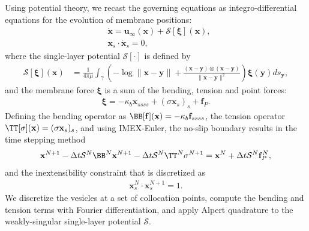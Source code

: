 \documentclass[11pt]{article}
\newcommand{\ff}{\mathbf{f}}
\newcommand{\uu}{\mathbf{u}}
\newcommand{\xx}{\mathbf{x}}
\renewcommand{\SS}{\mathcal{S}}
\newcommand{\xxi}{\boldsymbol{\xi}}
\newcommand{\yy}{\mathbf{y}}
\begin{document}
Using potential theory, we recast the governing equations as integro-differential equations for the evolution of membrane positions: 
%
\begin{align}
\label{eq:far_field_bc}
  &\dot{\xx} = \uu_{\infty}(\xx) + \SS[\xxi](\xx), \\
\label{eq:inextensibility}
  &\xx_s \cdot \dot{\xx}_s = 0,
 \end{align}
%
where the single-layer potential $\SS[\cdot]$ is defined by
\begin{align}
  \SS[\xxi](\xx) &= \frac{1}{4\pi\mu} \int_\gamma \left(
    -\log \|\xx - \yy\| + \frac{(\xx - \yy) \otimes (\xx - \yy)}{\|\xx - \yy\|^2} \right) 
    \xxi(\yy) ds_\yy, 
  \label{eqn:SLP}
\end{align}
%
and the membrane force $\xxi$ is a sum of the bending, tension and point forces: 
\begin{align}
\xxi = -\kappa_b \xx_{ssss} + (\sigma \xx_s)_s + \ff_P.
\label{eqn:traction}
\end{align}
Defining the bending operator as $\BB[\ff](\xx) = -\kappa_b \ff_{ssss}$,
the tension operator $\TT[\sigma](\xx) = (\sigma \xx_s)_s$, and using
IMEX-Euler, the no-slip boundary results in the time stepping method
\begin{align*}
  \xx^{N+1} - \Delta t \SS^N \BB^N \xx^{N+1} - 
    \Delta t \SS^N \TT^N \sigma^{N+1} = \xx^N + 
    \Delta t \SS^N \ff_P^N,
\end{align*}
and the inextensibility constraint that is discretized as
\begin{align*}
  \xx_s^{N} \cdot \xx_{s}^{N+1} = 1.
\end{align*}
We discretize the vesicles at a set of collocation points, compute the
bending and tension terms with Fourier differentiation, and apply Alpert
quadrature to the weakly-singular single-layer potential
$\SS$.  

\end{document}
